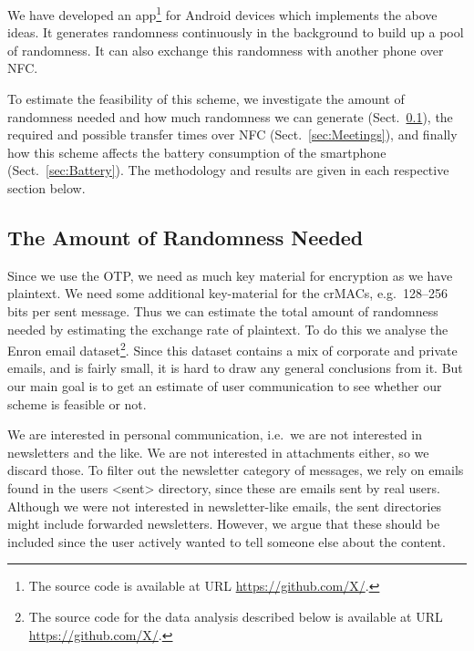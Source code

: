 We have developed an app\footnote{%
  The source code is available at URL \url{https://github.com/X/}.
} for Android devices which implements the above ideas.
It generates randomness continuously in the background to build up a pool of 
randomness.
It can also exchange this randomness with another phone over \ac{NFC}.

To estimate the feasibility of this scheme, we investigate the amount of 
randomness needed and how much randomness we can generate 
(Sect.~\ref{sec:NeededRandomness}), the required and possible transfer times 
over \ac{NFC} (Sect.~\ref{sec:Meetings}), and finally how this scheme affects 
the battery consumption of the smartphone (Sect.~\ref{sec:Battery}).
The methodology and results are given in each respective section below.

\subsection{The Amount of Randomness Needed}
\label{sec:NeededRandomness}
Since we use the \ac{OTP}, we need as much key material for encryption as we 
have plaintext.
We need some additional key-material for the \acp{crMAC}, e.g.~128--256 bits 
per sent message.
Thus we can estimate the total amount of randomness needed by estimating the 
exchange rate of plaintext.
To do this we analyse the Enron email dataset\footnote{%
  The source code for the data analysis described below is available at URL 
  \url{https://github.com/X/}.
}.
Since this dataset contains a mix of corporate and private emails, and is 
fairly small, it is hard to draw any general conclusions from it.
But our main goal is to get an estimate of user communication to see whether 
our scheme is feasible or not.

We are interested in personal communication, i.e.~we are not interested in 
newsletters and the like.
We are not interested in attachments either, so we discard those.
To filter out the newsletter category of messages, we rely on emails found in 
the users <sent> directory, since these are emails sent by real users.
Although we were not interested in newsletter-like emails, the sent directories 
might include forwarded newsletters.
However, we argue that these should be included since the user actively wanted 
to tell someone else about the content.


